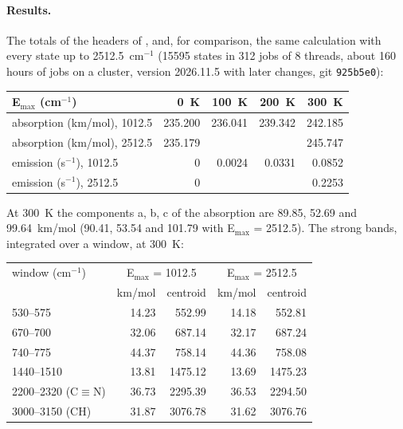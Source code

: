 \paragraph{Results.} The totals of the headers of
, and, for comparison, the same calculation with
every state up to 2512.5~cm$^{-1}$ (15595 states in 312 jobs of 8
threads, about 160 hours of jobs on a cluster, version 2026.11.5 with
later changes, git \texttt{925b5e0}):
\begin{center}
\small
\begin{tabular}{lrrrr}
\hline
E$_\mathrm{max}$ (cm$^{-1}$) & 0~K & 100~K & 200~K & 300~K \\
\hline
absorption (km/mol), 1012.5 & 235.200 & 236.041 & 239.342 & 242.185 \\
absorption (km/mol), 2512.5 & 235.179 & & & 245.747 \\
emission (s$^{-1}$), 1012.5 & 0 & 0.0024 & 0.0331 & 0.0852 \\
emission (s$^{-1}$), 2512.5 & 0 & & & 0.2253 \\
\hline
\end{tabular}
\end{center}
At 300~K the components a, b, c of the absorption are 89.85, 52.69 and
99.64~km/mol (90.41, 53.54 and 101.79 with E$_\mathrm{max}$ =
2512.5). The strong bands, integrated over a window, at 300~K:
\begin{center}
\begin{tabular}{lrrrr}
\hline
window (cm$^{-1}$) & \multicolumn{2}{c}{E$_\mathrm{max}$ = 1012.5} &
\multicolumn{2}{c}{E$_\mathrm{max}$ = 2512.5} \\
 & km/mol & centroid & km/mol & centroid \\
\hline
530--575 & 14.23 & 552.99 & 14.18 & 552.81 \\
670--700 & 32.06 & 687.14 & 32.17 & 687.24 \\
740--775 & 44.37 & 758.14 & 44.36 & 758.08 \\
1440--1510 & 13.81 & 1475.12 & 13.69 & 1475.23 \\
2200--2320 (C$\equiv$N) & 36.73 & 2295.39 & 36.53 & 2294.50 \\
3000--3150 (CH) & 31.87 & 3076.78 & 31.62 & 3076.76 \\
\hline
\end{tabular}
\end{center}
